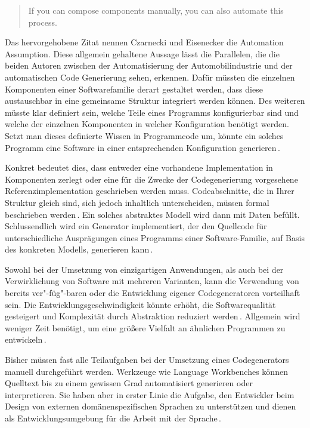 \documentclass[12pt,oneside,a4paper,parskip]{scrbook}
\begin{document}
\begin{quote}
\glqq If you can compose components manually, you can also automate this process.\grqq
\end{quote}

Das hervorgehobene Zitat nennen Czarnecki und Eisenecker die Automation Assumption. Diese allgemein gehaltene Aussage lässt die Parallelen, die die beiden Autoren zwischen der Automatisierung der Automobilindustrie und der automatischen Code Generierung sehen, erkennen. Dafür müssten die einzelnen Komponenten einer Softwarefamilie derart gestaltet werden, dass diese austauschbar in eine gemeinsame Struktur integriert werden können. Des weiteren müsste klar definiert sein, welche Teile eines Programms konfigurierbar sind und welche der einzelnen Komponenten in welcher Konfiguration benötigt werden. Setzt man dieses definierte Wissen in Programmcode um, könnte ein solches Programm eine Software in einer entsprechenden Konfiguration generieren\,\cite{czaeis2000}.

Konkret bedeutet dies, dass entweder eine vorhandene Implementation in Komponenten zerlegt oder eine für die Zwecke der Codegenerierung vorgesehene Referenzimplementation geschrieben werden muss. Codeabschnitte, die in Ihrer Struktur gleich sind, sich jedoch inhaltlich unterscheiden, müssen formal beschrieben werden\,\cite{stahl2007}. Ein solches abstraktes Modell wird dann mit Daten befüllt. Schlussendlich wird ein Generator implementiert, der den Quellcode für unterschiedliche Ausprägungen eines Programms einer Software-Familie, auf Basis des konkreten Modells, generieren kann\,\cite{fowler2010}.

Sowohl bei der Umsetzung von einzigartigen Anwendungen, als auch bei der Verwirklichung von Software mit mehreren Varianten, kann die Verwendung von bereits ver"-füg"-baren oder die Entwicklung eigener Codegeneratoren vorteilhaft sein. Die Entwicklungsgeschwindigkeit könnte erhöht, die Softwarequalität gesteigert und Komplexität durch Abstraktion reduziert werden\,\cite{stahl2007}. Allgemein wird weniger Zeit benötigt, um eine größere Vielfalt an ähnlichen Programmen zu entwickeln\,\cite{czaeis2000}.

Bisher müssen fast alle Teilaufgaben bei der Umsetzung eines Codegenerators manuell durchgeführt werden. Werkzeuge wie Language Workbenches können Quelltext bis zu einem gewissen Grad automatisiert generieren oder interpretieren. Sie haben aber in erster Linie die Aufgabe, den Entwickler beim Design von externen domänenspezifischen Sprachen zu unterstützen und dienen als Entwicklungsumgebung für die Arbeit mit der Sprache\,\cite{fowler2010}.
\end{document}
